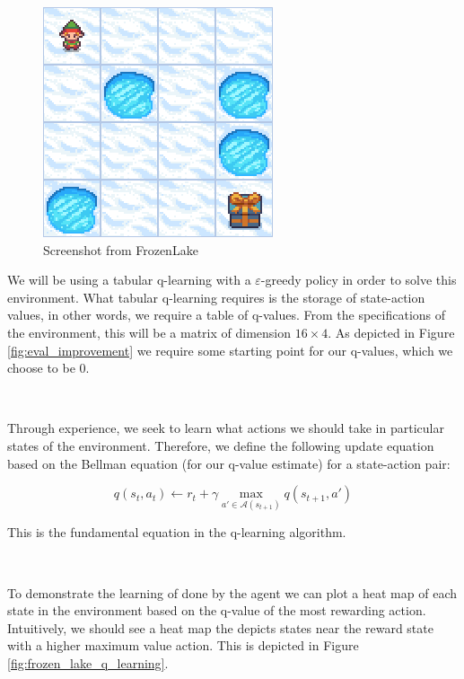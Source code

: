 \documentclass{article}
\begin{document}
\begin{figure}
	\centering
	\includegraphics[scale=0.5]{images/frozen_lake_frame.png}
	\caption{Screenshot from FrozenLake \citep{kwiatkowski2024gymnasium}}
	\label{fig:frozen_lake}
\end{figure}

We will be using a tabular q-learning with a $\varepsilon$-greedy policy in order to solve this environment. What tabular q-learning requires is the storage of state-action values, in other words, we require a table of q-values. From the specifications of the environment, this will be a matrix of dimension $16 \times 4$. As depicted in Figure \ref{fig:eval_improvement} we require some starting point for our q-values, which we choose to be $0$. 

\

Through experience, we seek to learn what actions we should take in particular states of the environment. Therefore, we define the following update equation based on the Bellman equation (for our q-value estimate) for a state-action pair:

\begin{equation}\label{eq:q_update}
    q(s_t, a_t) \leftarrow r_t + \gamma  \max_{a' \in \mathcal{A}(s_{t+1})} q(s_{t+1}, a')
\end{equation}

This is the fundamental equation in the q-learning algorithm.

\

To demonstrate the learning of done by the agent we can plot a heat map of each state in the environment based on the q-value of the most rewarding action. Intuitively, we should see a heat map the depicts states near the reward state with a higher maximum value action. This is depicted in Figure \ref{fig:frozen_lake_q_learning}.
\end{document}

